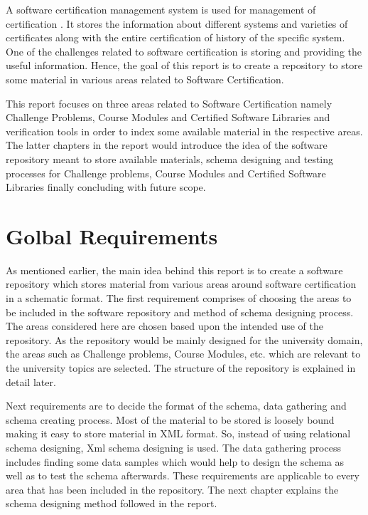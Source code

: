 \documentclass[11pt,letterpaper]{report}
\begin{document}
A software certification management system is used for management of certification \cite{SCMS}. It stores the information about different systems and varieties of certificates along with the entire certification of history of the specific system. One of the challenges related to software certification is storing and providing the useful information. Hence, the goal of this report is to create a repository to store some material in various areas related to Software Certification.

This report focuses on three areas related to Software Certification namely Challenge Problems, Course Modules and Certified Software Libraries and verification tools in order to index some available material in the respective areas. The latter chapters in the report would introduce the idea of the software repository meant to store available materials, schema designing and testing processes for Challenge problems, Course Modules and Certified Software Libraries finally concluding with future scope.

\chapter{Golbal Requirements}
As mentioned earlier, the main idea behind this report is to create a software repository which stores material from various areas around software certification in a schematic format. The first requirement comprises of choosing the areas to be included in the software repository and method of schema designing process. The areas considered here are chosen based upon the intended use of the repository. As the repository would be mainly designed for the university domain, the areas such as Challenge problems, Course Modules, etc. which are relevant to the university topics are selected. The structure of the repository is explained in detail later.

Next requirements are to decide the format of the schema, data gathering and schema creating process. Most of the material to be stored is loosely bound making it easy to store material in XML format. So, instead of using relational schema designing, Xml schema designing is used. The data gathering process includes finding some data samples which would help to design the schema as well as to test the schema afterwards. These requirements are applicable to every area that has been included in the repository. The next chapter explains the schema designing method followed in the report.
\end{document}
